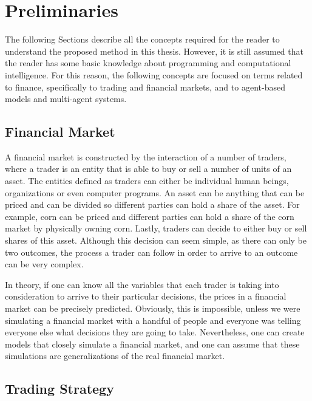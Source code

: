 \chapter{Preliminaries}
\label{chapter:preliminaries}

The following Sections describe all the concepts required for the reader to understand the proposed method in this thesis. However, it is still assumed that the reader has some basic knowledge about programming and computational intelligence. For this reason, the following concepts are focused on terms related to finance, specifically to trading and financial markets, and to agent-based models and multi-agent systems.

\section{Financial Market}
\label{section:financial-market}

A financial market is constructed by the interaction of a number of traders, where a trader is an entity that is able to buy or sell a number of units of an asset. The entities defined as traders can either be individual human beings, organizations or even computer programs. An asset can be anything that can be priced and can be divided so different parties can hold a share of the asset. For example, corn can be priced and different parties can hold a share of the corn market by physically owning corn. Lastly, traders can decide to either buy or sell shares of this asset. Although this decision can seem simple, as there can only be two outcomes, the process a trader can follow in order to arrive to an outcome can be very complex.

In theory, if one can know all the variables that each trader is taking into consideration to arrive to their particular decisions, the prices in a financial market can be precisely predicted. Obviously, this is impossible, unless we were simulating a financial market with a handful of people and everyone was telling everyone else what decisions they are going to take. Nevertheless, one can create models that closely simulate a financial market, and one can assume that these simulations are generalizations of the real financial market.

\section{Trading Strategy}
\label{section:trading-strategy}

